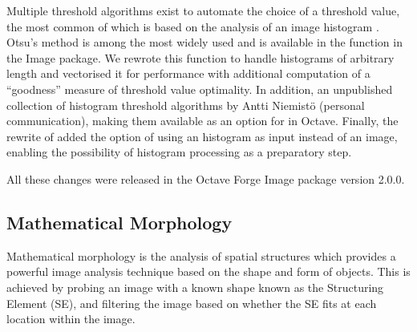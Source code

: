 Multiple threshold algorithms exist to automate the choice of a
threshold value, the most common of which is based on the analysis
of an image histogram \citep{analysis-hist-threshold}.  Otsu's method
\citep{otsu-threshold} is among the most widely used
and is available in the function  in the Image
package.  We rewrote this function to handle histograms of arbitrary
length and vectorised it for performance with additional computation of a
``goodness'' measure of threshold value optimality.
In addition, an unpublished collection of histogram
threshold algorithms by Antti Niemistö (personal communication),
making them available as an
option for  in Octave.  Finally, the rewrite
of  added the
option of using an histogram as input instead of an image, enabling
the possibility of histogram processing as a preparatory step.


All these changes were released in the Octave Forge Image
package version 2.0.0.

\subsection{Mathematical Morphology}

Mathematical morphology is the analysis of spatial
structures which provides a powerful image analysis technique based on
the shape and form of objects.  This is achieved by probing an image
with a known shape known as the Structuring Element (SE), and filtering the
image based on whether the SE fits at each location
within the image.

